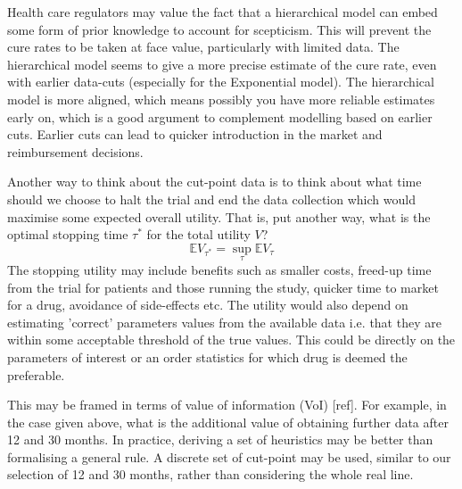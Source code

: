 \documentclass[AMA,STIX1COL]{WileyNJD-v2}
\begin{document}
Health care regulators may value the fact that a hierarchical model can embed some form of prior knowledge to account for scepticism.
This will prevent the cure rates to be taken at face value, particularly with limited data.
The hierarchical model seems to give a more precise estimate of the cure rate, even with earlier data-cuts (especially for the Exponential model).
The hierarchical model is more aligned, which means possibly you have more reliable estimates early on, which is a good argument to complement modelling based on earlier cuts.
Earlier cuts can lead to quicker introduction in the market and reimbursement decisions.

Another way to think about the cut-point data is to think about what time should we choose to halt the trial and end the data collection which would maximise some expected overall utility.
That is, put another way, what is the optimal stopping time $\tau^*$ for the total utility $V$?
$$
\mathbb{E} V_{\tau^*} = \sup_{\tau} \mathbb{E} V_{\tau}
$$
The stopping utility may include benefits such as smaller costs, freed-up time from the trial for patients and those running the study, quicker time to market for a drug, avoidance of side-effects etc.
The utility would also depend on estimating 'correct' parameters values from the available data i.e. that they are within some acceptable threshold of the true values.
This could be directly on the parameters of interest or an order statistics for which drug is deemed the preferable.

This may be framed in terms of value of information (VoI) [ref].
For example, in the case given above, what is the additional value of obtaining further data after 12 and 30 months.
In practice, deriving a set of heuristics may be better than formalising a general rule.
A discrete set of cut-point may be used, similar to our selection of 12 and 30 months, rather than considering the whole real line.
\end{document}
